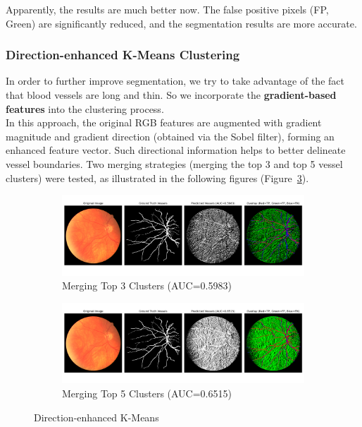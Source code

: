 \documentclass[12pt,letterpaper]{article}
\begin{document}
\noindent
Apparently, the results are much better now. The false positive pixels (FP, Green) are significantly reduced, and the segmentation results are more accurate. 
\subsubsection{Direction-enhanced K-Means Clustering}
In order to further improve segmentation, we try to take advantage of the fact that blood vessels are long and thin. So we incorporate the \textbf{gradient-based features} into the clustering process. \\
In this approach, the original RGB features are augmented with gradient magnitude and gradient direction (obtained via the Sobel filter), forming an enhanced feature vector. Such directional information helps to better delineate vessel boundaries. Two merging strategies (merging the top 3 and top 5 vessel clusters) were tested, as illustrated in the following figures (Figure~\ref{fig:de}).
\begin{figure}[H]
    \centering
    \begin{subfigure}[H]{\textwidth}
        \centering
        \includegraphics[scale=0.35]{Figures/5 Directed (Merge 3 Clusters).png}
        \vspace{-0.5cm}
        \caption{Merging Top 3 Clusters (AUC=0.5983)}
        \label{fig:de3}
    \end{subfigure}
    \begin{subfigure}[H]{\textwidth}
        \centering
        \includegraphics[scale=0.35]{Figures/5 Directed (Merge 5 Clusters).png}
        \vspace{-0.5cm}
        \caption{Merging Top 5 Clusters (AUC=0.6515)}
        \label{fig:de5}
    \end{subfigure}
    \caption{Direction-enhanced K-Means}
    \label{fig:de}
\end{figure}
\end{document}

